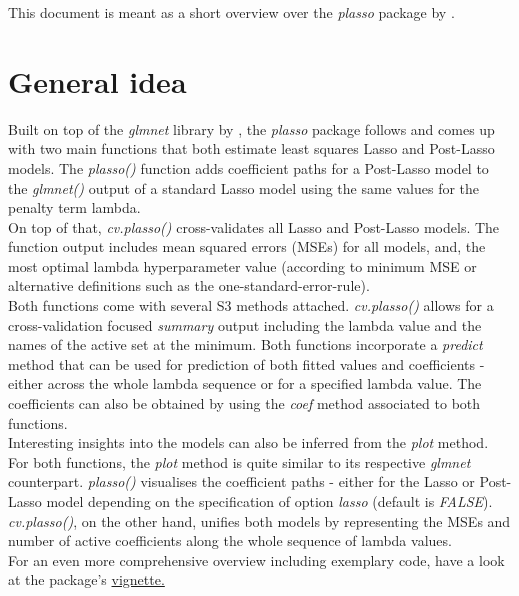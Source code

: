 \documentclass[12pt]{article}
\begin{document}
\maketitle

This document is meant as a short overview over the \emph{plasso} package by \citet{plasso}.

\section{General idea}

Built on top of the \emph{glmnet} library by \citet{glmnet}, the \emph{plasso} package follows \citet{knaus} and comes up with two main functions that both estimate least squares Lasso and Post-Lasso models. The \emph{plasso()} function adds coefficient paths for a Post-Lasso model to the \emph{glmnet()} output of a standard Lasso model using the same values for the penalty term lambda.\\
On top of that, \emph{cv.plasso()} cross-validates all Lasso and Post-Lasso models. The function output includes mean squared errors (MSEs) for all models, and, the most optimal lambda hyperparameter value (according to minimum MSE or alternative definitions such as the one-standard-error-rule).\\

Both functions come with several S3 methods attached. \emph{cv.plasso()} allows for a cross-validation focused \emph{summary} output including the lambda value and the names of the active set at the minimum. Both functions incorporate a \emph{predict} method that can be used for prediction of both fitted values and coefficients - either across the whole lambda sequence or for a specified lambda value. The coefficients can also be obtained by using the \emph{coef} method associated to both functions.\\
Interesting insights into the models can also be inferred from the \emph{plot} method. For both functions, the \emph{plot} method is quite similar to its respective \emph{glmnet} counterpart. \emph{plasso()} visualises the coefficient paths - either for the Lasso or Post-Lasso model depending on the specification of option \emph{lasso} (default is \emph{FALSE}). \emph{cv.plasso()}, on the other hand, unifies both models by representing the MSEs and number of active coefficients along the whole sequence of lambda values.\\

For an even more comprehensive overview including exemplary code, have a look at the package's \href{https://cran.r-project.org/web/packages/plasso/vignettes/plasso.html}{vignette.}
\end{document}
